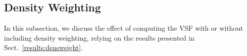 \subsection{Density Weighting}\label{discussion:densweight}


In this subsection, we discuss the effect 
     of computing the VSF with or without including density weighting, relying on the 
     results presented in Sect.~\ref{results:densweight}.


